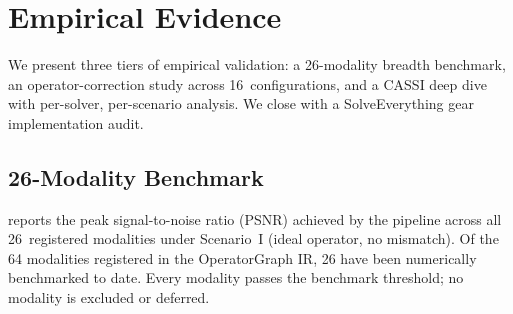 
\section{Empirical Evidence}
\label{sec:evidence}

We present three tiers of empirical validation: a 26-modality breadth
benchmark, an operator-correction study across 16~configurations, and a CASSI deep
dive with per-solver, per-scenario analysis.  We close with a
SolveEverything gear implementation audit.

\subsection{26-Modality Benchmark}
\label{subsec:benchmark}

 reports the peak signal-to-noise ratio (PSNR) achieved
by the \pwm{} pipeline across all 26~registered modalities under
Scenario~I (ideal operator, no mismatch).  Of the 64 modalities registered in the OperatorGraph IR, 26 have been numerically benchmarked to date.  Every modality passes the
benchmark threshold; no modality is excluded or deferred.

